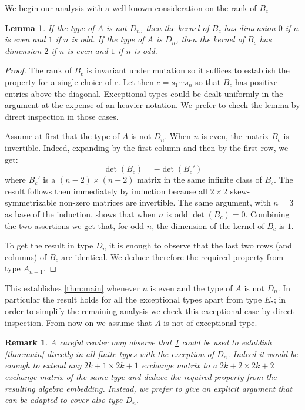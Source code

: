 \documentclass[11pt]{amsart}
\newtheorem{lemma}[theorem]{Lemma}
\newtheorem{remark}[theorem]{Remark}
\numberwithin{equation}{section}
\begin{document}
  We begin our analysis with a well known consideration on the rank of $B_c$ 
  \begin{lemma}
    \label{lem:dimensions}
    If the type of $A$ is not $D_n$, then the kernel of $B_c$ has dimension $0$ if $n$ is even and $1$ if $n$ is odd.
    If the type of $A$ is $D_n$, then the kernel of $B_c$ has dimension $2$ if $n$ is even and $1$ if $n$ is odd.
  \end{lemma}
  \begin{proof}
    The rank of $B_c$ is invariant under mutation so it suffices to establish the property for a single choice of $c$. 
    Let then $c=s_1\cdots s_n$ so that $B_c$ has positive entries above the diagonal.
    Exceptional types could be dealt uniformly in the argument at the expense of an heavier notation. 
    We prefer to check the lemma by direct inspection in those cases.

    Assume at first that the type of $A$ is not $D_n$.
    When $n$ is even, the matrix $B_c$ is invertible. 
    Indeed, expanding by the first column and then by the first row, we get:
    \[
      \det(B_c)=-\det(B_c')
    \]
    where $B_c'$ is a $(n-2)\times(n-2)$ matrix in the same infinite class of $B_c$. 
    The result follows then immediately by induction because all $2\times2$ skew-symmetrizable non-zero matrices are invertible.
    The same argument, with $n=3$ as base of the induction, shows that when $n$ is odd $\det(B_c)=0$.
    Combining the two assertions we get that, for odd $n$, the dimension of the kernel of $B_c$ is $1$.

    To get the result in type $D_n$ it is enough to observe that the last two rows (and columns) of $B_c$ are identical. 
    We deduce therefore the required property from type $A_{n-1}$.
  \end{proof}

  This establishes \cref{thm:main} whenever $n$ is even and the type of $A$ is not $D_n$.
  In particular the result holds for all the exceptional types apart from type $E_7$; in order to simplify the remaining analysis we check this exceptional case by direct inspection.
  From now on we assume that $A$ is not of exceptional type.

  \begin{remark}
    A careful reader may observe that \cref{lem:dimensions} could be used to establish \cref{thm:main} directly in all finite types with the exception of $D_n$. 
    Indeed it would be enough to extend any $2k+1 \times 2k+1$ exchange matrix to a $2k+2\times2k+2$ exchange matrix of the same type and deduce the required property from the resulting algebra embedding.
    Instead, we prefer to give an explicit argument that can be adapted to cover also type $D_n$.
  \end{remark}
\end{document}
